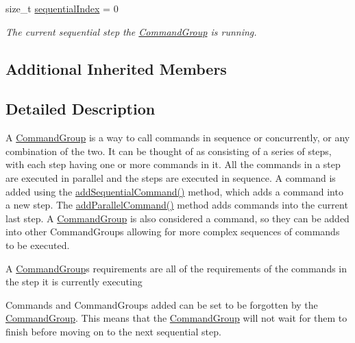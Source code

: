 \begin{DoxyCompactItemize}
\mbox{\label{classlib_iterative_robot_1_1_command_group_ae6ba0e30e4caa58f4b019ab496487ab7}} 
size\+\_\+t \mbox{\hyperlink{classlib_iterative_robot_1_1_command_group_ae6ba0e30e4caa58f4b019ab496487ab7}{sequential\+Index}} = 0
\begin{DoxyCompactList}\small\item\em The current sequential step the \mbox{\hyperlink{classlib_iterative_robot_1_1_command_group}{Command\+Group}} is running. \end{DoxyCompactList}\end{DoxyCompactItemize}
\subsection*{Additional Inherited Members}


\subsection{Detailed Description}
A \mbox{\hyperlink{classlib_iterative_robot_1_1_command_group}{Command\+Group}} is a way to call commands in sequence or concurrently, or any combination of the two. It can be thought of as consisting of a series of steps, with each step having one or more commands in it. All the commands in a step are executed in parallel and the steps are executed in sequence. A command is added using the \mbox{\hyperlink{classlib_iterative_robot_1_1_command_group_a7e3167a89a45e6b1fc5df9a18c2946b7}{add\+Sequential\+Command()}} method, which adds a command into a new step. The \mbox{\hyperlink{classlib_iterative_robot_1_1_command_group_a7255a0b640e74ce74870939b45d23a58}{add\+Parallel\+Command()}} method adds commands into the current last step. A \mbox{\hyperlink{classlib_iterative_robot_1_1_command_group}{Command\+Group}} is also considered a command, so they can be added into other Command\+Groups allowing for more complex sequences of commands to be executed.

A \mbox{\hyperlink{classlib_iterative_robot_1_1_command_group}{Command\+Group}}\textquotesingle{}s requirements are all of the requirements of the commands in the step it is currently executing

Commands and Command\+Groups added can be set to be \textquotesingle{}forgotten\textquotesingle{} by the \mbox{\hyperlink{classlib_iterative_robot_1_1_command_group}{Command\+Group}}. This means that the \mbox{\hyperlink{classlib_iterative_robot_1_1_command_group}{Command\+Group}} will not wait for them to finish before moving on to the next sequential step. 

